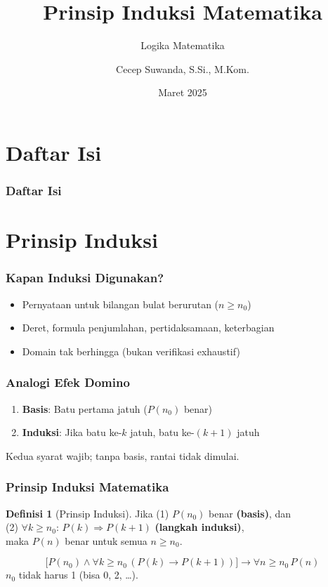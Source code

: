 \documentclass[handout]{beamer}
\subtitle[Logika Matematika]{Logika Matematika}
\title[Induksi Matematika]{Prinsip Induksi Matematika}
\author{Cecep Suwanda, S.Si., M.Kom.}
\date{Maret 2025}
\institute{Universitas Bale Bandung}
\theoremstyle{definition}
\newtheorem{definisi}[theorem]{Definisi}
\theoremstyle{example}
\begin{document}
\maketitle

\section*{Daftar Isi}
\begin{frame}
\frametitle{Daftar Isi}
\tableofcontents
\end{frame}

\section{Prinsip Induksi}

\begin{frame}
\frametitle{Kapan Induksi Digunakan?}
\begin{itemize}
  \item Pernyataan untuk bilangan bulat berurutan ($n \geq n_0$)
  \item Deret, formula penjumlahan, pertidaksamaan, keterbagian
  \item Domain tak berhingga (bukan verifikasi exhaustif)
\end{itemize}
\end{frame}

\begin{frame}
\frametitle{Analogi Efek Domino}
\begin{enumerate}
  \item \textbf{Basis}: Batu pertama jatuh ($P(n_0)$ benar)
  \item \textbf{Induksi}: Jika batu ke-$k$ jatuh, batu ke-$(k+1)$ jatuh
\end{enumerate}
Kedua syarat wajib; tanpa basis, rantai tidak dimulai.
\end{frame}

\begin{frame}
\frametitle{Prinsip Induksi Matematika}
\begin{definisi}[Prinsip Induksi]
Jika (1) $P(n_0)$ benar \textbf{(basis)}, dan\\
(2) $\forall k \geq n_0$: $P(k) \Rightarrow P(k+1)$ \textbf{(langkah induksi)},\\
maka $P(n)$ benar untuk semua $n \geq n_0$.
\end{definisi}
\[
\bigl[ P(n_0) \wedge \forall k \geq n_0\, (P(k) \to P(k+1)) \bigr] \to \forall n \geq n_0\, P(n)
\]
$n_0$ tidak harus 1 (bisa 0, 2, \ldots).
\end{frame}
\end{document}
